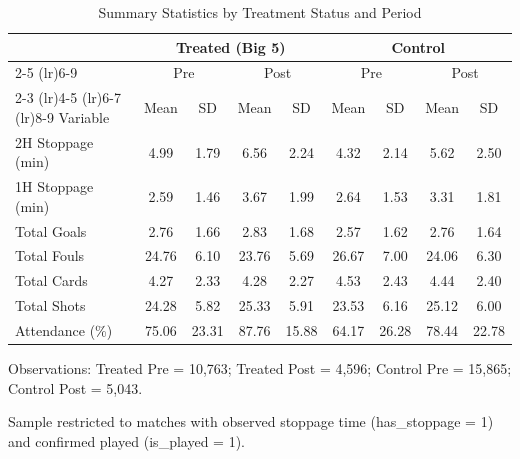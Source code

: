 \begin{table}[htbp]
\centering
\caption{Summary Statistics by Treatment Status and Period}
\label{tab:summary_stats_v3}
\small
\begin{threeparttable}
\begin{tabular}{lcccccccc}
\toprule
 & \multicolumn{4}{c}{Treated (Big 5)} & \multicolumn{4}{c}{Control} \\
\cmidrule(lr){2-5} \cmidrule(lr){6-9}
 & \multicolumn{2}{c}{Pre} & \multicolumn{2}{c}{Post} & \multicolumn{2}{c}{Pre} & \multicolumn{2}{c}{Post} \\
\cmidrule(lr){2-3} \cmidrule(lr){4-5} \cmidrule(lr){6-7} \cmidrule(lr){8-9}
Variable & Mean & SD & Mean & SD & Mean & SD & Mean & SD \\
\midrule
2H Stoppage (min) & 4.99 & 1.79 & 6.56 & 2.24 & 4.32 & 2.14 & 5.62 & 2.50 \\
1H Stoppage (min) & 2.59 & 1.46 & 3.67 & 1.99 & 2.64 & 1.53 & 3.31 & 1.81 \\
Total Goals & 2.76 & 1.66 & 2.83 & 1.68 & 2.57 & 1.62 & 2.76 & 1.64 \\
Total Fouls & 24.76 & 6.10 & 23.76 & 5.69 & 26.67 & 7.00 & 24.06 & 6.30 \\
Total Cards & 4.27 & 2.33 & 4.28 & 2.27 & 4.53 & 2.43 & 4.44 & 2.40 \\
Total Shots & 24.28 & 5.82 & 25.33 & 5.91 & 23.53 & 6.16 & 25.12 & 6.00 \\
Attendance (\%) & 75.06 & 23.31 & 87.76 & 15.88 & 64.17 & 26.28 & 78.44 & 22.78 \\
\bottomrule
\end{tabular}
\begin{tablenotes}
\small
\item Observations: Treated Pre = 10,763; Treated Post = 4,596; Control Pre = 15,865; Control Post = 5,043.
\item Sample restricted to matches with observed stoppage time (has\_stoppage = 1) and confirmed played (is\_played = 1).
\end{tablenotes}
\end{threeparttable}
\end{table}